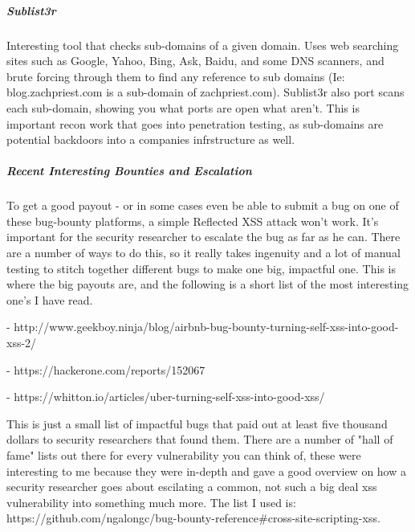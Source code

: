 \subparagraph{Sublist3r}
Interesting tool that checks sub-domains of a given domain. Uses web searching sites such as Google, Yahoo, Bing, Ask, Baidu, and some DNS scanners, and brute forcing through them to find any reference to sub domains (Ie: blog.zachpriest.com is a sub-domain of zachpriest.com).
Sublist3r also port scans each sub-domain, showing you what ports are open what aren’t.  This is important recon work that goes into penetration testing, as sub-domains are potential backdoors into a companies infrstructure as well.

\subparagraph{Recent Interesting Bounties and Escalation }
To get a good payout - or in some cases even be able to submit a bug on one of these bug-bounty platforms, a simple Reflected XSS attack won’t work.  It’s important for the security researcher to escalate the bug as far as he can.  There are a number of ways to do this, so it really takes ingenuity and a lot of manual testing to stitch together different bugs to make one big, impactful one.  This is where the big payouts are, and the following is a short list of the most interesting one’s I have read.  


- http://www.geekboy.ninja/blog/airbnb-bug-bounty-turning-self-xss-into-good-xss-2/


- https://hackerone.com/reports/152067


- https://whitton.io/articles/uber-turning-self-xss-into-good-xss/

This is just a small list of impactful bugs that paid out at least five thousand dollars to security researchers that found them.  There are a number of "hall of fame" lists out there for every vulnerability you can think of, these were interesting to me because they were in-depth and gave a good overview on how a security researcher goes about escilating a common, not such a big deal xss vulnerability into something much more.  The list I used is: https://github.com/ngalongc/bug-bounty-reference#cross-site-scripting-xss.

